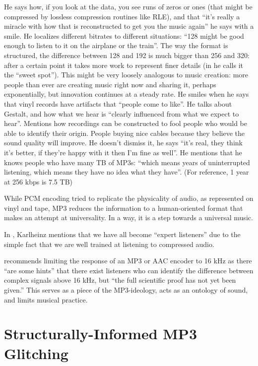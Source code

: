 \documentclass{thesis}
\begin{document}
He says how, if you look at the data, you see runs of zeros or ones (that might be compressed by lossless compression routines like RLE), and that ``it's really a miracle with how that is reconstructed to get you the music again'' he says with a smile. He localizes different bitrates to different situations: ``128 might be good enough to listen to it on the airplane or the train''. The way the format is structured, the difference between 128 and 192 is much bigger than 256 and 320: after a certain point it takes more work to represent finer details (in \cite[9]{karlheinz_brandenburg_mp3_1999} he calls it the ``sweet spot''). This might be very loosely analogous to music creation: more people than ever are creating music right now and sharing it, perhaps exponentially, but innovation continues at a steady rate. He smiles when he says that vinyl records have artifacts that ``people come to like''. He talks about Gestalt, and how what we hear is ``clearly influenced from what we expect to hear''. Mentions how recordings can be constructed to fool people who would be able to identify their origin. People buying nice cables because they believe the sound quality will improve. He doesn't dismiss it, he says ``it's real, they think it's better, if they're happy with it then I'm fine as well''. He mentions that he knows people who have many TB of MP3s: ``which means years of uninterrupted listening, which means they have no idea what they have''. (For reference, 1 year at 256 kbps is 7.5 TB) \cite{tom_merritt_real_2010}

While PCM encoding tried to replicate the physicality of audio, as represented on vinyl and tape, MP3 reduces the information to a human-oriented format that makes an attempt at universality. In a way, it is a step towards a universal music.

In \cite[9]{karlheinz_brandenburg_mp3_1999}, Karlheinz mentions that we have all become ``expert listeners'' due to the simple fact that we are well trained at listening to compressed audio.

\cite[10]{karlheinz_brandenburg_mp3_1999} recommends limiting the response of an MP3 or AAC encoder to 16 kHz as there ``are some hints'' that there exist listeners who can identify the difference between complex signals above 16 kHz, but ``the full scientific proof has not yet been given.'' This serves as a piece of the MP3-ideology, acts as an ontology of sound, and limits musical practice.
	
\section{Structurally-Informed MP3 Glitching}
\end{document}

